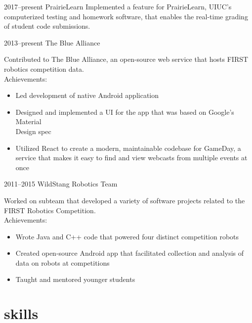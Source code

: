 \documentclass[nofooter]{resume}
\begin{document}
\begin{entrylist}


\entry
{2017--present}
{PrairieLearn}
{}
{Implemented a feature for PrairieLearn, UIUC's computerized testing and homework software, that enables the real-time grading of student code submissions.}


\entry
{2013--present}
{The Blue Alliance}
{}
{Contributed to The Blue Alliance, an open-source web service that hosts FIRST robotics competition data. \\
Achievements:
\noindent\begin{itemize}[leftmargin=0.45cm]
\item Led development of native Android application
\item Designed and implemented a UI for the app that was based on Google's Material \\Design spec
\item Utilized React to create a modern, maintainable codebase for GameDay, a service that makes it easy to find and view webcasts from multiple events at once
\end{itemize}}


\entry
{2011--2015}
{WildStang Robotics Team}
{}
{Worked on subteam that developed a variety of software projects related to the FIRST Robotics Competition. \\
Achievements:
\noindent\begin{itemize}[leftmargin=0.45cm]
\item Wrote Java and C++ code that powered four distinct competition robots
\item Created open-source Android app that facilitated collection and analysis of data on robots at competitions
\item Taught and mentored younger students
\end{itemize}}

\end{entrylist}


\section{skills}
\end{document}
